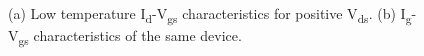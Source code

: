 \documentclass[11pt,a4paper]{report}
\begin{document}
\begin{figure}
    \begin{minipage}{.5\linewidth}
    \centering
    \end{minipage}
    \begin{minipage}{.5\linewidth}
    \centering
    
    \end{minipage}\par\medskip
    \caption{(a) Low temperature I\textsubscript{d}-V\textsubscript{gs} characteristics for positive V\textsubscript{ds}. (b) I\textsubscript{g}-V\textsubscript{gs} characteristics of the same device.}
    \label{fig:Vds Sweep}
\end{figure}
\end{document}
